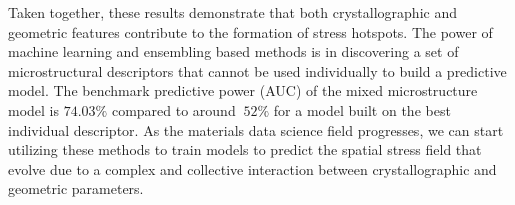 \documentclass[preprint,1p,times,authoryear]{elsarticle}%
\begin{document}




Taken together, these results demonstrate that both crystallographic and geometric features contribute to the formation of stress hotspots. The power of machine learning and ensembling based methods is in discovering a set of microstructural descriptors that cannot be used individually to build a predictive model. The benchmark predictive power (AUC) of the mixed microstructure model is $74.03\%$ compared to around $~52\%$ for a model built on the best individual descriptor. As the materials data science field progresses, we can start utilizing these methods to train models to predict the spatial stress field that evolve due to a complex and collective interaction between crystallographic and geometric parameters.
\end{document}

